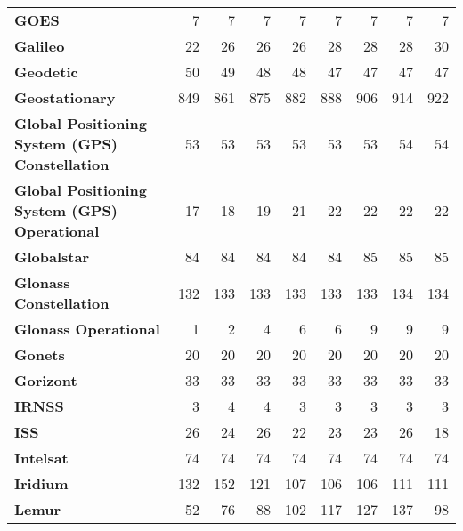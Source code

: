 \begin{table}
\begin{tabular}{lrrrrrrrr}
		\textbf{GOES}                                          & 7              & 7    & 7    & 7    & 7    & 7    & 7    & 7          \\
		\textbf{Galileo}                                       & 22             & 26   & 26   & 26   & 28   & 28   & 28   & 30         \\
		\textbf{Geodetic}                                      & 50             & 49   & 48   & 48   & 47   & 47   & 47   & 47         \\
		\textbf{Geostationary}                                 & 849            & 861  & 875  & 882  & 888  & 906  & 914  & 922        \\
		\textbf{Global Positioning System (GPS) Constellation} & 53             & 53   & 53   & 53   & 53   & 53   & 54   & 54         \\
		\textbf{Global Positioning System (GPS) Operational}   & 17             & 18   & 19   & 21   & 22   & 22   & 22   & 22         \\
		\textbf{Globalstar}                                    & 84             & 84   & 84   & 84   & 84   & 85   & 85   & 85         \\
		\textbf{Glonass Constellation}                         & 132            & 133  & 133  & 133  & 133  & 133  & 134  & 134        \\
		\textbf{Glonass Operational}                           & 1              & 2    & 4    & 6    & 6    & 9    & 9    & 9          \\
		\textbf{Gonets}                                        & 20             & 20   & 20   & 20   & 20   & 20   & 20   & 20         \\
		\textbf{Gorizont}                                      & 33             & 33   & 33   & 33   & 33   & 33   & 33   & 33         \\
		\textbf{IRNSS}                                         & 3              & 4    & 4    & 3    & 3    & 3    & 3    & 3          \\
		\textbf{ISS}                                           & 26             & 24   & 26   & 22   & 23   & 23   & 26   & 18         \\
		\textbf{Intelsat}                                      & 74             & 74   & 74   & 74   & 74   & 74   & 74   & 74         \\
		\textbf{Iridium}                                       & 132            & 152  & 121  & 107  & 106  & 106  & 111  & 111        \\
		\textbf{Lemur}                                         & 52             & 76   & 88   & 102  & 117  & 127  & 137  & 98         \\

\end{tabular}
\end{table}
